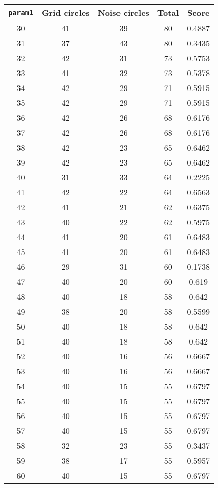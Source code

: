 \documentclass[letterpaper, 12pt]{article}
\begin{document}
\begin{longtable}{|c|c|c|c|c|}
\hline
\textbf{\texttt{param1}} & \textbf{Grid circles} & \textbf{Noise circles} & \textbf{Total} & \textbf{Score} \\
\hline
30 & 41 & 39 & 80 & 0.4887 \\
\hline
31 & 37 & 43 & 80 & 0.3435 \\
\hline
32 & 42 & 31 & 73 & 0.5753 \\
\hline
33 & 41 & 32 & 73 & 0.5378 \\
\hline
34 & 42 & 29 & 71 & 0.5915 \\
\hline
35 & 42 & 29 & 71 & 0.5915 \\
\hline
36 & 42 & 26 & 68 & 0.6176 \\
\hline
37 & 42 & 26 & 68 & 0.6176 \\
\hline
38 & 42 & 23 & 65 & 0.6462 \\
\hline
39 & 42 & 23 & 65 & 0.6462 \\
\hline
40 & 31 & 33 & 64 & 0.2225 \\
\hline
41 & 42 & 22 & 64 & 0.6563 \\
\hline
42 & 41 & 21 & 62 & 0.6375 \\
\hline
43 & 40 & 22 & 62 & 0.5975 \\
\hline
44 & 41 & 20 & 61 & 0.6483 \\
\hline
45 & 41 & 20 & 61 & 0.6483 \\
\hline
46 & 29 & 31 & 60 & 0.1738 \\
\hline
47 & 40 & 20 & 60 & 0.619 \\
\hline
48 & 40 & 18 & 58 & 0.642 \\
\hline
49 & 38 & 20 & 58 & 0.5599 \\
\hline
50 & 40 & 18 & 58 & 0.642 \\
\hline
51 & 40 & 18 & 58 & 0.642 \\
\hline
52 & 40 & 16 & 56 & 0.6667 \\
\hline
53 & 40 & 16 & 56 & 0.6667 \\
\hline
54 & 40 & 15 & 55 & 0.6797 \\
\hline
55 & 40 & 15 & 55 & 0.6797 \\
\hline
56 & 40 & 15 & 55 & 0.6797 \\
\hline
57 & 40 & 15 & 55 & 0.6797 \\
\hline
58 & 32 & 23 & 55 & 0.3437 \\
\hline
59 & 38 & 17 & 55 & 0.5957 \\
\hline
60 & 40 & 15 & 55 & 0.6797 \\

\end{longtable}
\end{document}
